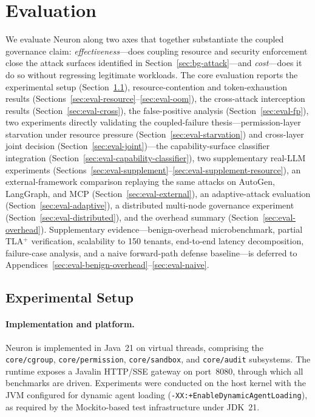 \section{Evaluation}
\label{sec:eval}

We evaluate Neuron along two axes that together substantiate the coupled
governance claim: \emph{effectiveness}---does coupling resource and security
enforcement close the attack surfaces identified in Section~\ref{sec:bg-attack}---and
\emph{cost}---does it do so without regressing legitimate workloads. The
core evaluation reports the experimental setup (Section~\ref{sec:eval-setup}),
resource-contention and token-exhaustion results
(Sections~\ref{sec:eval-resource}--\ref{sec:eval-oom}), the cross-attack
interception results (Section~\ref{sec:eval-cross}), the false-positive
analysis (Section~\ref{sec:eval-fp}), two experiments directly validating
the coupled-failure thesis---permission-layer starvation under resource
pressure (Section~\ref{sec:eval-starvation}) and cross-layer joint
decision (Section~\ref{sec:eval-joint})---the capability-surface
classifier integration (Section~\ref{sec:eval-capability-classifier}),
two supplementary real-LLM experiments
(Sections~\ref{sec:eval-supplement}--\ref{sec:eval-supplement-resource}),
an external-framework comparison replaying the same attacks on AutoGen,
LangGraph, and MCP (Section~\ref{sec:eval-external}), an adaptive-attack
evaluation (Section~\ref{sec:eval-adaptive}), a distributed multi-node
governance experiment (Section~\ref{sec:eval-distributed}), and the
overhead summary (Section~\ref{sec:eval-overhead}). Supplementary evidence---benign-overhead
microbenchmark, partial TLA$^+$ verification, scalability to 150 tenants,
end-to-end latency decomposition, failure-case analysis, and a naive
forward-path defense baseline---is deferred to
Appendices~\ref{sec:eval-benign-overhead}--\ref{sec:eval-naive}.

\subsection{Experimental Setup}
\label{sec:eval-setup}

\paragraph{Implementation and platform.}
Neuron is implemented in Java~21 on virtual threads, comprising the
\texttt{core/cgroup}, \texttt{core/permission}, \texttt{core/sandbox}, and
\texttt{core/audit} subsystems. The runtime exposes a Javalin HTTP/SSE gateway
on port~8080, through which all benchmarks are driven. Experiments were
conducted on the host kernel with the JVM configured for dynamic agent
loading (\texttt{-XX:+EnableDynamicAgentLoading}), as required by the
Mockito-based test infrastructure under JDK~21.

